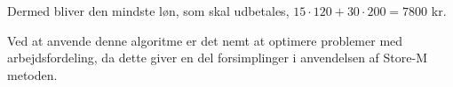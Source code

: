 \begin{eks}
Dermed bliver den mindste løn, som skal udbetales, $15 \cdot 120 + 30 \cdot 200 = 7800$ kr.

\end{eks}

Ved at anvende denne algoritme er det nemt at optimere problemer med arbejdsfordeling, da dette giver en del forsimplinger i anvendelsen af Store-M metoden. 